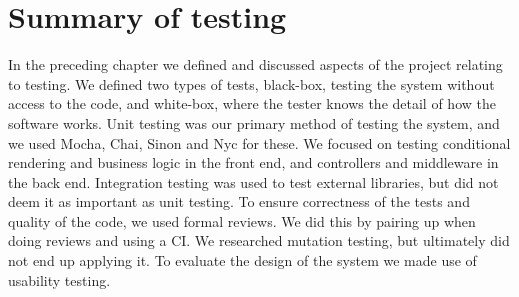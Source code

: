 \section{Summary of testing}
In the preceding chapter we defined and discussed aspects of the project relating to testing.
We defined two types of tests, black-box, testing the system without access to the code, and white-box, where the tester knows the detail of how the software works.
Unit testing was our primary method of testing the system, and we used Mocha, Chai, Sinon and Nyc for these.
We focused on testing conditional rendering and business logic in the front end, and controllers and middleware in the back end.
Integration testing was used to test external libraries, but did not deem it as important as unit testing.
To ensure correctness of the tests and quality of the code, we used formal reviews.
We did this by pairing up when doing reviews and using a CI.
We researched mutation testing, but ultimately did not end up applying it.
To evaluate the design of the system we made use of usability testing.
